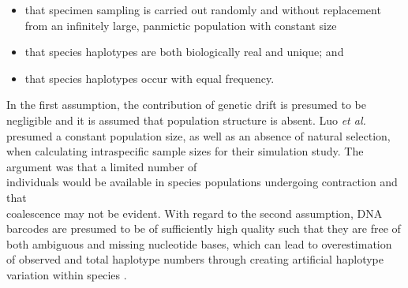 \begin{itemize}

\item that specimen sampling is carried out randomly and without replacement from an infinitely large, panmictic population with constant size

\vspace{1mm}

\item that species haplotypes are both biologically real and unique; and

\vspace{1mm}

\item that species haplotypes occur with equal frequency.

\end{itemize}



In the first assumption, the contribution of genetic drift is presumed to be negligible and it is assumed that population structure is absent. Luo \textit{et al.} \cite{luo2015simulation} presumed a constant population size, as well as an absence of natural selection, when calculating intraspecific sample sizes for their simulation study. The argument was that a limited number of \\ individuals would be available in species populations undergoing contraction and that \\ coalescence may not be evident. With regard to the second assumption, DNA barcodes are presumed to be of sufficiently high quality such that they are free of both ambiguous and missing nucleotide bases, which can lead to overestimation of observed and total haplotype numbers through creating artificial haplotype variation within species \cite{athey2013assessing, dasmahapatra2010mitochondrial, phillips2015exploration, stoeckle2012frequency, stoeckle2014dna}.



